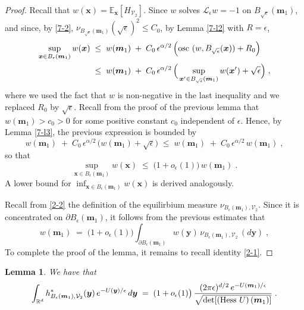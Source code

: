 \documentclass[reqno]{amsart}
\newtheorem{lemma}[theorem]{Lemma}
\newcounter{as}[section]
\newcommand{\mc}[1]{{\mathcal #1}}
\newcommand{\bb}[1]{{\mathbb #1}}
\newcommand{\bs}[1]{{\boldsymbol #1}}
\newcommand{\<}{\langle}
\renewcommand{\>}{\rangle}
\begin{document}
\begin{proof}
Recall that $w(\bs{x})=\mathbb{E}_{\bs{x}}[H_{\mc V_2}]$.  Since $w$
solves $\mc L_\epsilon w =-1$ on $B_{\sqrt{\epsilon}}(\bs m_1)$, and
since, by \eqref{7-2}, $\nu_{B_{\sqrt{\epsilon}}(\bs m_1)}
(\sqrt{\epsilon})^2 \le C_0$, by Lemma \ref{7-l2} with $R=\epsilon$,
\begin{align*}
\sup_{\bs x \in B_{\epsilon}(\bs m_1)} w(\bs x)
\; & \le\; w(\bs m_1)  \;+\; C_0 \, \epsilon^{\alpha/2}
\, \Big( \text{\rm osc } (w,B_{\sqrt{\epsilon}}(\bs x))
+ R_0 \Big) \\
& \le \; w(\bs m_1)  \;+\; C_0 \, \epsilon^{\alpha/2}
\, \Big( \sup_{\bs x' \in B_{\sqrt{\epsilon}}(\bs m_1)} w (\bs x')
+  \sqrt{\epsilon} \Big)\;,
\end{align*}
where we used the fact that $w$ is non-negative in the last inequality
and we replaced $R_0$ by $\sqrt{\epsilon}$. Recall from the proof of the
previous lemma that $w(\bs m_1) > c_0 >0$ for some positive constant
$c_0$ independent of $\epsilon$. Hence, by Lemma \ref{7-l3}, the
previous expression is bounded by
\begin{equation*}
w(\bs m_1)  \;+\; C_0 \, \epsilon^{\alpha/2}
\, \Big( w (\bs m_1) + \sqrt{\epsilon} \Big)
\;\le\; w(\bs m_1)  \;+\; C_0 \, \epsilon^{\alpha/2}
\, w (\bs m_1) \;,
\end{equation*}
so that
\begin{equation*}
\sup_{\bs x \in B_{\epsilon}(\bs m_1)} w(\bs x)
\;\le \; \big( 1 + o_\epsilon(1) \big) \, w (\bs m_1) \;.
\end{equation*}
A lower bound for $\inf_{\bs x \in B_{\epsilon}(\bs m_1)} w(\bs x)$ is
derived analogously.

Recall from \eqref{2-2} the definition of the equilirbium measure $\nu_{
  B_{\epsilon}(\bs m_1), \mc V_2}$.  Since it is concentrated on
$\partial B_{\epsilon}(\bs m_1)$, it follows from the previous
estimates that
\begin{equation*}
w (\bs m_1) \;=\; \big( 1 + o_\epsilon(1) \big)
\int_{\partial B_\epsilon(\bs m_1)} w (\bs{y}) \,
\nu_{ B_{\epsilon}(\bs m_1), \mc V_2} \, (d\bs{y}) \;,
\end{equation*}
To complete the proof of the lemma, it remains to recall identity
\eqref{2-1}.
\end{proof}

\begin{lemma}
\label{7-l12}
We have that
\begin{equation}
\label{7-8a}
\int_{\bb R^d} h^*_{B_\epsilon(\bs m_1), \mc V_2} (\bs y) \,
e^{-U(\bs y)/\epsilon}\, d\bs y \;=\; (1+o_\epsilon(1)\big) \,
\frac{(2\pi \epsilon)^{d/2}  \, e^{-U(\bs m_1)/\epsilon}}
{\sqrt{\det [(\text{\rm Hess }U)\, (\bs{m}_{1})]}}
\;.
\end{equation}
\end{lemma}
\end{document}
